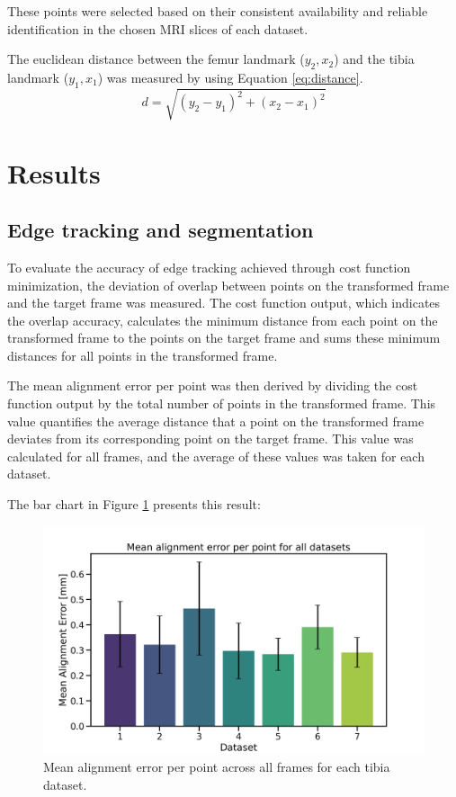 \documentclass{micro-econ-thesis}
\begin{document}
These points were selected based on their consistent availability and reliable identification in the chosen MRI slices of each dataset.

The euclidean distance between the femur landmark ($y_2, x_2$) and the tibia landmark ($y_1, x_1$) was measured by using Equation \ref{eq:distance}. 
\begin{equation}
	d = \sqrt{(y_2 - y_1)^2 + (x_2 - x_1)^2}
	\label{eq:distance}
\end{equation} 


\section{Results}
\label{sec:yetanother}

\subsection{Edge tracking and segmentation}

To evaluate the accuracy of edge tracking achieved through cost function minimization, the deviation of overlap between points on the transformed frame and the target frame was measured. The cost function output, which indicates the overlap accuracy, calculates the minimum distance from each point on the transformed frame to the points on the target frame and sums these minimum distances for all points in the transformed frame.

The mean alignment error per point was then derived by dividing the cost function output by the total number of points in the transformed frame. This value quantifies the average distance that a point on the transformed frame deviates from its corresponding point on the target frame. This value was calculated for all frames, and the average of these values was taken for each dataset.

The bar chart in Figure \ref{fig:avgofavg} presents this result: 

\begin{figure}[H]
	\centering
	\includegraphics[width=0.7\linewidth]{bar_alignment}
	\caption{Mean alignment error per point across all frames for each tibia dataset.}
	\label{fig:avgofavg}
\end{figure}
\end{document}

